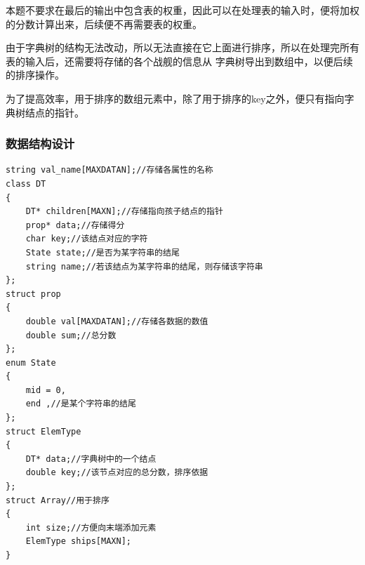 本题不要求在最后的输出中包含表的权重，因此可以在处理表的输入时，便将加权的分数计算出来，后续便不再需要表的权重。

由于字典树的结构无法改动，所以无法直接在它上面进行排序，所以在处理完所有表的输入后，还需要将存储的各个战舰的信息从
字典树导出到数组中，以便后续的排序操作。

为了提高效率，用于排序的数组元素中，除了用于排序的key之外，便只有指向字典树结点的指针。
\subsubsection{数据结构设计}
\begin{lstlisting}[name=Q1]
string val_name[MAXDATAN];//存储各属性的名称
class DT
{
    DT* children[MAXN];//存储指向孩子结点的指针
    prop* data;//存储得分
    char key;//该结点对应的字符
    State state;//是否为某字符串的结尾
    string name;//若该结点为某字符串的结尾，则存储该字符串
};
struct prop
{
    double val[MAXDATAN];//存储各数据的数值
    double sum;//总分数
};
enum State
{
    mid = 0,
    end ,//是某个字符串的结尾
};
struct ElemType
{
    DT* data;//字典树中的一个结点
    double key;//该节点对应的总分数，排序依据
};
struct Array//用于排序
{
    int size;//方便向末端添加元素
    ElemType ships[MAXN];
}
\end{lstlisting}
